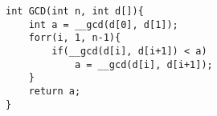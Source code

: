 \begin{verbatim}
int GCD(int n, int d[]){
	int a = __gcd(d[0], d[1]);
	forr(i, 1, n-1){
		if(__gcd(d[i], d[i+1]) < a)
			a = __gcd(d[i], d[i+1]);
	}
	return a;
}
\end{verbatim}